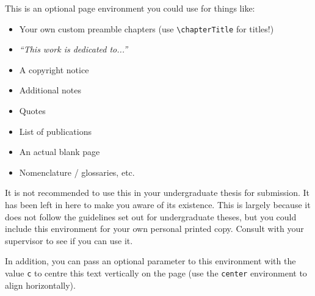 
\begin{blankpage}
    This is an optional page environment you could use for things like:
	\begin{itemize}
		\item Your own custom preamble chapters (use \texttt{\textbackslash chapterTitle} for titles!)
		\item \emph{``This work is dedicated to...''}
		\item A copyright notice
		\item Additional notes
		\item Quotes
		\item List of publications
		\item An actual blank page
		\item Nomenclature / glossaries, etc.
	\end{itemize}
	It is not recommended to use this in your undergraduate thesis for submission. It has been left in here to make you aware of its existence. This is largely because it does not follow the guidelines set out for undergraduate theses, but you could include this environment for your own personal printed copy. Consult with your supervisor to see if you can use it. 
	
	In addition, you can pass an optional parameter to this environment with the value \texttt{c} to centre this text vertically on the page (use the \texttt{center} environment to align horizontally).
\end{blankpage}